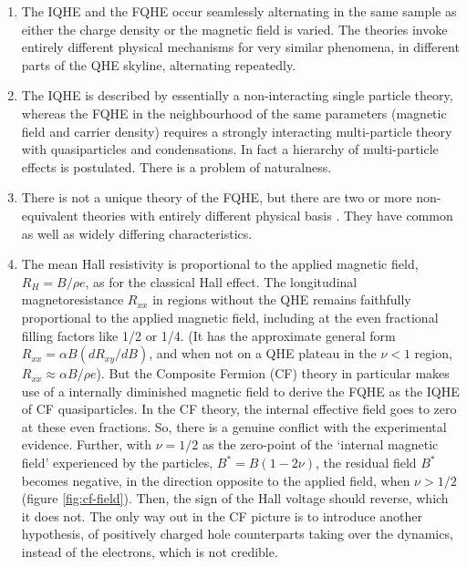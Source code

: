 \documentclass[aps,preprint,12pt,tightenlines]{revtex4}%
\begin{document}
\begin{enumerate}
\item The IQHE and the FQHE occur seamlessly alternating in the same sample as
either the charge density or the magnetic field is varied. The theories invoke
entirely different physical mechanisms for very similar phenomena, in
different parts of the QHE skyline, alternating repeatedly.

\item The IQHE is described by essentially a non-interacting single particle
theory, whereas the FQHE in the neighbourhood of the same parameters (magnetic
field and carrier density) requires a strongly interacting multi-particle
theory with quasiparticles and condensations. In fact a hierarchy of
multi-particle effects is postulated. There is a problem of naturalness.

\item There is not a unique theory of the FQHE, but there are two or more
non-equivalent theories with entirely different physical basis
\cite{Jain-IndianJl,Jain-PRL,Haldane-FQHE,Halperin-FQHE}. They have common as
well as widely differing characteristics.

\item The mean Hall resistivity is proportional to the applied magnetic field,
$R_{H}=B/\rho e$, as for the classical Hall effect. The longitudinal
magnetoresistance $R_{xx}$ in regions without the QHE remains faithfully
proportional to the applied magnetic field, including at the even fractional
filling factors like 1/2 or 1/4. (It has the approximate general form
$R_{xx}=\alpha B\left(  dR_{xy}/dB\right)  $, and when not on a QHE plateau in
the $\nu<1$ region, $R_{xx}\approx\alpha B/\rho e$). But the Composite Fermion
(CF) theory in particular makes use of a internally diminished magnetic field
to derive the FQHE as the IQHE of CF quasiparticles. In the CF theory, the
internal effective field goes to zero at these even fractions. So, there is a
genuine conflict with the experimental evidence. Further, with $\nu=1/2$ as
the zero-point of the `internal magnetic field' experienced by the particles,
$B^{\ast}=B\left(  1-2\nu\right)  $, the residual field $B^{\ast}$ becomes
negative, in the direction opposite to the applied field, when $\nu>1/2$
(figure \ref{fig:cf-field}). Then, the sign of the Hall voltage should reverse,
which it does not. The only way out in the CF picture is to introduce another
hypothesis, of positively charged hole counterparts taking over the dynamics,
instead of the electrons, which is not credible.


\end{enumerate}
\end{document}
